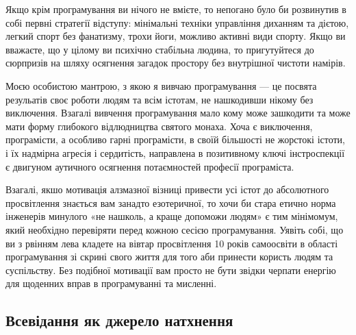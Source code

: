 Якщо крім програмування ви нічого не вмієте, то непогано було би розвинутив в собі первні
стратегії відступу: мінімальні техніки управління диханням та дієтою, легкий спорт без
фанатизму, трохи йоги, можливо активні види спорту. Якщо ви вважаєте, що у цілому
ви психічно стабільна людина, то пригутуйтеся до сюрпризів на шляху осягнення загадок
простору без внутрішної чистоти намірів.

Моєю особистою мантрою, з якою я вивчаю програмування --- це посвята резульатів своє
роботи людям та всім істотам, не нашкодивши нікому без виключення.
Взагалі вивчення програмування мало кому може зашкодити та може мати форму глибокого відлюдництва
святого монаха. Хоча є виключення, програмісти, а особливо гарні програмісти,
в своїй більшості не жорстокі істоти, і їх надмірна агресія і сердитість, направлена
в позитивному ключі інстроспекції є двигуном аутичного осягнення потаємностей професії програміста.

Взагалі, якшо мотивація алзмазної візниці привести усі істот до абсолютного просвітлення
знається вам занадто езотеричної, то хочи би стара етично норма інженерів минулого 
«не нашколь, а краще допоможи людям» є тим мінімомум, який необхідно перевіряти перед кожною сесією
програмування. Уявіть собі, що ви з рвінням лева кладете на вівтар просвітлення 10 років
самоосвіти в області програмування зі скрині свого життя для того аби принести користь людям та суспільству.
Без подібної мотивації вам просто не бути звідки черпати енергію для щоденних вправ в програмуванні та мисленні.

\subsection{Всевідання як джерело натхнення}

